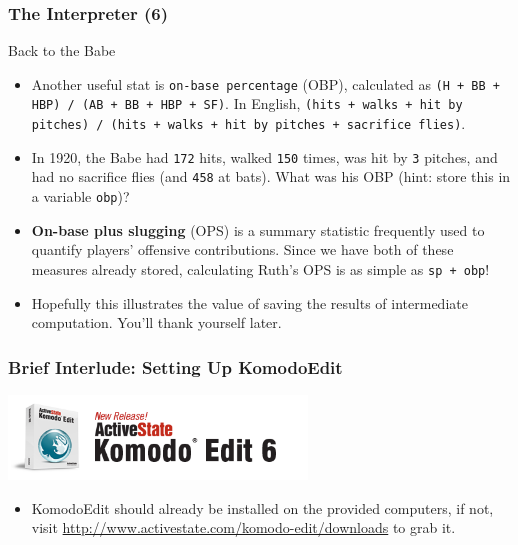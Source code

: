 \documentclass[10pt]{beamer}
\begin{document}
\begin{frame}
  \frametitle{The Interpreter (6)}
  \begin{block}{Back to the Babe}
    \begin{itemize}
      \item Another useful stat is \texttt{on-base percentage} (OBP), calculated as \texttt{(H + BB + HBP) / (AB + BB + HBP + SF)}.  
        In English, \texttt{(hits + walks + hit by pitches) / (hits + walks + hit by pitches + sacrifice flies)}.
      \item In 1920, the Babe had \texttt{172} hits, walked \texttt{150} times, was hit by \texttt{3} pitches, and had no sacrifice flies (and \texttt{458} at bats).
        What was his OBP (hint: store this in a variable \texttt{obp})?
      \item \textbf{On-base plus slugging} (OPS) is a summary statistic frequently used to quantify players' offensive contributions.
        Since we have both of these measures already stored, calculating Ruth's OPS is as simple as \texttt{sp + obp}!
      \item Hopefully this illustrates the value of saving the results of intermediate computation.
        You'll thank yourself later.
    \end{itemize}
  \end{block}
\end{frame}

\begin{frame}
  \frametitle{Brief Interlude: Setting Up KomodoEdit}
  \begin{center}
    \includegraphics[width=300px]{KomodoEdit.png}
  \end{center}
  \begin{itemize}
    \item KomodoEdit should already be installed on the provided computers, if not, visit \href{http://www.activestate.com/komodo-edit/downloads}{http://www.activestate.com/komodo-edit/downloads} to grab it.
  \end{itemize}
\end{frame}
\end{document}

